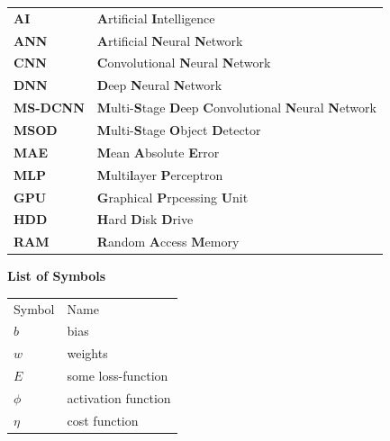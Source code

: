 \documentclass[12pt]{extarticle}
\begin{document}
	\begin{center}
		\begin{tabular}{l l}
			\multicolumn{1}{p{3cm}}{\large{\textbf{AI}}} &  \multicolumn{1}{p{8cm}}{\large{\textbf{A}rtificial \textbf{I}ntelligence}} \\
			\multicolumn{1}{p{3cm}}{\large{\textbf{ANN}}} &  \multicolumn{1}{p{8cm}}{\large{\textbf{A}rtificial \textbf{N}eural \textbf{N}etwork}} \\
			\multicolumn{1}{p{3cm}}{\large{\textbf{CNN}}} &  \multicolumn{1}{p{8cm}}{\large{\textbf{C}onvolutional \textbf{N}eural \textbf{N}etwork}}\\ 
			\multicolumn{1}{p{3cm}}{\large{\textbf{DNN}}} &  \multicolumn{1}{p{8cm}}{\large{\textbf{D}eep \textbf{N}eural \textbf{N}etwork}} \\
			\multicolumn{1}{p{3cm}}{\large{\textbf{MS-DCNN}}} &  \multicolumn{1}{p{8cm}}{\large{\textbf{M}ulti-\textbf{S}tage \textbf{D}eep \textbf{C}onvolutional \textbf{N}eural \textbf{N}etwork}}\\ 
			\multicolumn{1}{p{3cm}}{\large{\textbf{MSOD}}} &  \multicolumn{1}{p{8cm}}{\large{\textbf{M}ulti-\textbf{S}tage \textbf{O}bject \textbf{D}etector}}\\ 
			\multicolumn{1}{p{3cm}}{\large{\textbf{MAE}}} &  \multicolumn{1}{p{8cm}}{\large{\textbf{M}ean \textbf{A}bsolute \textbf{E}rror}}\\  
			\multicolumn{1}{p{3cm}}{\large{\textbf{MLP}}} &  \multicolumn{1}{p{8cm}}{\large{\textbf{M}ulti\textbf{l}ayer \textbf{P}erceptron}}\\ 
			\multicolumn{1}{p{3cm}}{\large{\textbf{GPU}}} &  \multicolumn{1}{p{8cm}}{\large{\textbf{G}raphical \textbf{P}rpcessing \textbf{U}nit}}\\ 
			\multicolumn{1}{p{3cm}}{\large{\textbf{HDD}}} &  \multicolumn{1}{p{8cm}}{\large{\textbf{H}ard \textbf{D}isk \textbf{D}rive}}\\ 
			\multicolumn{1}{p{3cm}}{\large{\textbf{RAM}}} &  \multicolumn{1}{p{8cm}}{\large{\textbf{R}andom \textbf{A}ccess \textbf{M}emory}}
			 
		\end{tabular}
	\end{center}

	\newpage
	\LARGE{\textbf{List of Symbols}}\\ \vspace{1cm}
	\large{}
	\begin{center}
		\begin{tabular}{l l}
			{Symbol} & {Name} \\
			$b$ & bias\\
			$w$ & weights\\
			$E$ & some loss-function\\
			$\phi$ & activation function\\
			$\eta$ & cost function
		\end{tabular}
	\end{center}
	
\end{document}
